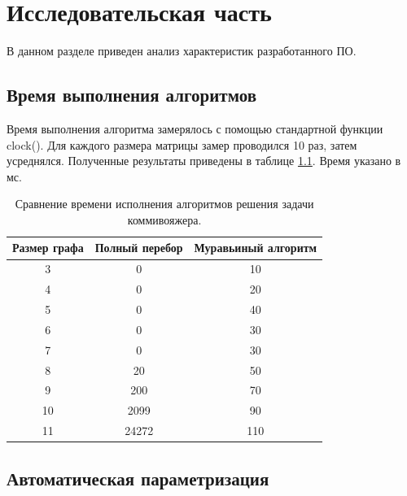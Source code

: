 \documentclass[12pt]{report}
\begin{document}
\chapter{Исследовательская часть}
	
В данном разделе приведен анализ характеристик разработанного ПО.
	
\section{Время выполнения алгоритмов}
	
Время выполнения алгоритма замерялось с помощью стандартной функции clock(). Для каждого размера матрицы замер проводился 10 раз, затем усреднялся. Полученные результаты приведены в таблице \ref{tab:timing}. Время указано в мс.

\begin{table}[H]

\caption{Сравнение времени исполнения алгоритмов решения задачи коммивояжера.}

	\begin{center}

		\begin{tabular}{|c|c|c|}

			\hline

			Размер графа & Полный перебор & Муравьиный алгоритм \\

			\hline
			3 & 0 & 10 \\
			4 & 0 & 20 \\
			5 & 0 & 40 \\
			6 & 0 & 30 \\
			7 & 0 & 30 \\
			8 & 20 & 50 \\
			9 & 200 & 70 \\
			10 & 2099 & 90 \\
			11 & 24272 & 110 \\
			\hline

		\end{tabular}

	\end{center}

	\label{tab:timing}

\end{table}

\section{Автоматическая параметризация}
\end{document}
